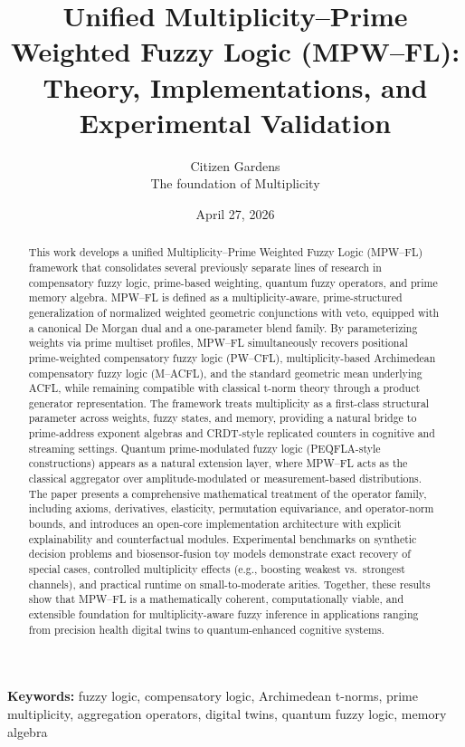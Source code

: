 \documentclass[11pt]{article}
\title{Unified Multiplicity--Prime Weighted Fuzzy Logic (MPW--FL):\\
Theory, Implementations, and Experimental Validation}
\author{Citizen Gardens \\ The foundation of Multiplicity
}
\date{April 27, 2026}
\begin{document}
\maketitle

\begin{abstract}
This work develops a unified Multiplicity--Prime Weighted Fuzzy Logic (MPW--FL) framework that consolidates several previously separate lines of research in compensatory fuzzy logic, prime-based weighting, quantum fuzzy operators, and prime memory algebra. MPW--FL is defined as a multiplicity-aware, prime-structured generalization of normalized weighted geometric conjunctions with veto, equipped with a canonical De Morgan dual and a one-parameter blend family. By parameterizing weights via prime multiset profiles, MPW--FL simultaneously recovers positional prime-weighted compensatory fuzzy logic (PW--CFL), multiplicity-based Archimedean compensatory fuzzy logic (M--ACFL), and the standard geometric mean underlying ACFL, while remaining compatible with classical t-norm theory through a product generator representation. The framework treats multiplicity as a first-class structural parameter across weights, fuzzy states, and memory, providing a natural bridge to prime-address exponent algebras and CRDT-style replicated counters in cognitive and streaming settings. Quantum prime-modulated fuzzy logic (PEQFLA-style constructions) appears as a natural extension layer, where MPW--FL acts as the classical aggregator over amplitude-modulated or measurement-based distributions. The paper presents a comprehensive mathematical treatment of the operator family, including axioms, derivatives, elasticity, permutation equivariance, and operator-norm bounds, and introduces an open-core implementation architecture with explicit explainability and counterfactual modules. Experimental benchmarks on synthetic decision problems and biosensor-fusion toy models demonstrate exact recovery of special cases, controlled multiplicity effects (e.g., boosting weakest vs.\ strongest channels), and practical runtime on small-to-moderate arities. Together, these results show that MPW--FL is a mathematically coherent, computationally viable, and extensible foundation for multiplicity-aware fuzzy inference in applications ranging from precision health digital twins to quantum-enhanced cognitive systems.
\end{abstract}
\newpage
\tableofcontents
\newpage
\noindent\textbf{Keywords:}
fuzzy logic, compensatory logic, Archimedean t-norms, prime multiplicity, aggregation operators, digital twins, quantum fuzzy logic, memory algebra
\end{document}
